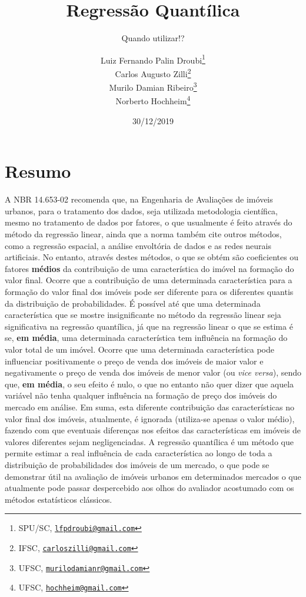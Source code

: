 \documentclass[a4paper, 12pt]{article}
\title{Regressão Quantílica}
\subtitle{Quando utilizar!?}
\author{Luiz Fernando Palin Droubi\footnote{SPU/SC,
  \href{mailto:lfpdroubi@gmail.com}{\nolinkurl{lfpdroubi@gmail.com}}} \\ Carlos Augusto Zilli\footnote{IFSC,
  \href{mailto:carloszilli@gmail.com}{\nolinkurl{carloszilli@gmail.com}}} \\ Murilo Damian Ribeiro\footnote{UFSC,
  \href{mailto:murilodamianr@gmail.com}{\nolinkurl{murilodamianr@gmail.com}}
} \\ Norberto Hochheim\footnote{UFSC,
  \href{mailto:hochheim@gmail.com}{\nolinkurl{hochheim@gmail.com}}}}
\date{30/12/2019}
\begin{document}
\maketitle

\hypertarget{resumo}{%
\section*{Resumo}\label{resumo}}

A NBR 14.653-02 recomenda que, na Engenharia de Avaliações de imóveis
urbanos, para o tratamento dos dados, seja utilizada metodologia
científica, mesmo no tratamento de dados por fatores, o que usualmente é
feito através do método da regressão linear, ainda que a norma também
cite outros métodos, como a regressão espacial, a análise envoltória de
dados e as redes neurais artificiais. No entanto, através destes
métodos, o que se obtém são coeficientes ou fatores \textbf{médios} da
contribuição de uma característica do imóvel na formação do valor final.
Ocorre que a contribuição de uma determinada característica para a
formação do valor final dos imóveis pode ser diferente para os
diferentes quantis da distribuição de probabilidades. É possível até que
uma determinada característica que se mostre insignificante no método da
regressão linear seja significativa na regressão quantílica, já que na
regressão linear o que se estima é se, \textbf{em média}, uma
determinada característica tem influência na formação do valor total de
um imóvel. Ocorre que uma determinada característica pode influenciar
positivamente o preço de venda dos imóveis de maior valor e
negativamente o preço de venda dos imóveis de menor valor (ou \emph{vice
versa}), sendo que, \textbf{em média}, o seu efeito é nulo, o que no
entanto não quer dizer que aquela variável não tenha qualquer influência
na formação de preço dos imóveis do mercado em análise. Em suma, esta
diferente contribuição das características no valor final dos imóveis,
atualmente, é ignorada (utiliza-se apenas o valor médio), fazendo com
que eventuais diferenças nos efeitos das características em imóveis de
valores diferentes sejam negligenciadas. A regressão quantílica é um
método que permite estimar a real influência de cada característica ao
longo de toda a distribuição de probabilidades dos imóveis de um
mercado, o que pode se demonstrar útil na avaliação de imóveis urbanos
em determinados mercados o que atualmente pode passar despercebido aos
olhos do avaliador acostumado com os métodos estatísticos clássicos.
\end{document}
